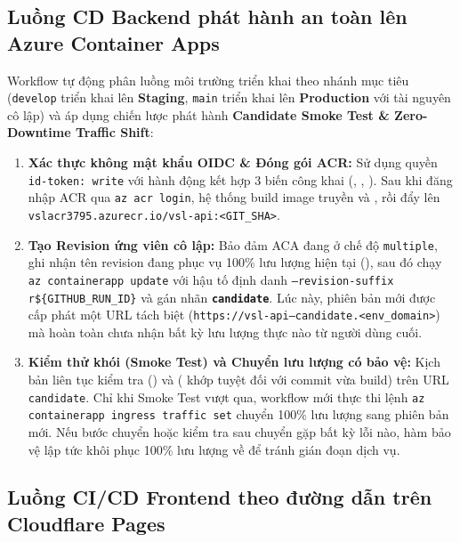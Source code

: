 \subsection{Luồng CD Backend phát hành an toàn lên Azure Container Apps}
\label{subsec:luong_cd}

Workflow  tự động phân luồng môi trường triển khai theo nhánh mục tiêu (\texttt{develop} triển khai lên \textbf{Staging}, \texttt{main} triển khai lên \textbf{Production} với tài nguyên cô lập) và áp dụng chiến lược phát hành \textbf{Candidate Smoke Test \& Zero-Downtime Traffic Shift}:
\begin{enumerate}
    \item \textbf{Xác thực không mật khẩu OIDC \& Đóng gói ACR:} Sử dụng quyền \texttt{id-token: write} với hành động  kết hợp 3 biến công khai (, , ). Sau khi đăng nhập ACR qua \texttt{az acr login}, hệ thống build image truyền  và , rồi đẩy lên \texttt{vslacr3795.azurecr.io/vsl-api:<GIT\_SHA>}.
    \item \textbf{Tạo Revision ứng viên cô lập:} Bảo đảm ACA đang ở chế độ \texttt{multiple}, ghi nhận tên revision đang phục vụ 100\% lưu lượng hiện tại (), sau đó chạy \texttt{az containerapp update} với hậu tố định danh \texttt{--revision-suffix r\$\{GITHUB\_RUN\_ID\}} và gán nhãn \textbf{\texttt{candidate}}. Lúc này, phiên bản mới được cấp phát một URL tách biệt (\texttt{https://vsl-api---candidate.<env\_domain>}) mà hoàn toàn chưa nhận bất kỳ lưu lượng thực nào từ người dùng cuối.
    \item \textbf{Kiểm thử khói (Smoke Test) và Chuyển lưu lượng có bảo vệ:} Kịch bản  liên tục kiểm tra  () và  ( khớp tuyệt đối với commit vừa build) trên URL \texttt{candidate}. Chỉ khi Smoke Test vượt qua, workflow mới thực thi lệnh \texttt{az containerapp ingress traffic set} chuyển 100\% lưu lượng sang phiên bản mới. Nếu bước chuyển hoặc kiểm tra sau chuyển gặp bất kỳ lỗi nào, hàm bảo vệ  lập tức khôi phục 100\% lưu lượng về  để tránh gián đoạn dịch vụ.
\end{enumerate}

\subsection{Luồng CI/CD Frontend theo đường dẫn trên Cloudflare Pages}
\label{subsec:luong_cd_frontend}

